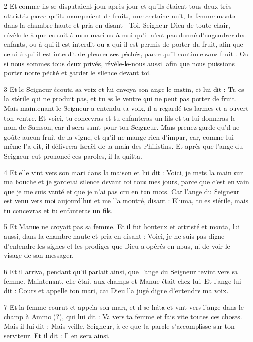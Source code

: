 \par 2 Et comme ils se disputaient jour après jour et qu'ils étaient tous deux très attristés parce qu'ils manquaient de fruits, une certaine nuit, la femme monta dans la chambre haute et pria en disant : Toi, Seigneur Dieu de toute chair, révèle-le à que ce soit à mon mari ou à moi qu'il n'est pas donné d'engendrer des enfants, ou à qui il est interdit ou à qui il est permis de porter du fruit, afin que celui à qui il est interdit de pleurer ses péchés, parce qu'il continue sans fruit . Ou si nous sommes tous deux privés, révèle-le-nous aussi, afin que nous puissions porter notre péché et garder le silence devant toi.

\par 3 Et le Seigneur écouta sa voix et lui envoya son ange le matin, et lui dit : Tu es la stérile qui ne produit pas, et tu es le ventre qui ne peut pas porter de fruit. Mais maintenant le Seigneur a entendu ta voix, il a regardé tes larmes et a ouvert ton ventre. Et voici, tu concevras et tu enfanteras un fils et tu lui donneras le nom de Samson, car il sera saint pour ton Seigneur. Mais prenez garde qu'il ne goûte aucun fruit de la vigne, et qu'il ne mange rien d'impur, car, comme lui-même l'a dit, il délivrera Israël de la main des Philistins. Et après que l'ange du Seigneur eut prononcé ces paroles, il la quitta.

\par 4 Et elle vint vers son mari dans la maison et lui dit : Voici, je mets la main sur ma bouche et je garderai silence devant toi tous mes jours, parce que c'est en vain que je me suis vanté et que je n'ai pas cru en ton mots. Car l'ange du Seigneur est venu vers moi aujourd'hui et me l'a montré, disant : Eluma, tu es stérile, mais tu concevras et tu enfanteras un fils.

\par 5 Et Manue ne croyait pas sa femme. Et il fut honteux et attristé et monta, lui aussi, dans la chambre haute et pria en disant : Voici, je ne suis pas digne d'entendre les signes et les prodiges que Dieu a opérés en nous, ni de voir le visage de son messager.

\par 6 Et il arriva, pendant qu'il parlait ainsi, que l'ange du Seigneur revint vers sa femme. Maintenant, elle était aux champs et Manue était chez lui. Et l'ange lui dit : Cours et appelle ton mari, car Dieu l'a jugé digne d'entendre ma voix.

\par 7 Et la femme courut et appela son mari, et il se hâta et vint vers l'ange dans le champ à Ammo (?), qui lui dit : Va vers ta femme et fais vite toutes ces choses. Mais il lui dit : Mais veille, Seigneur, à ce que ta parole s'accomplisse sur ton serviteur. Et il dit : Il en sera ainsi.

